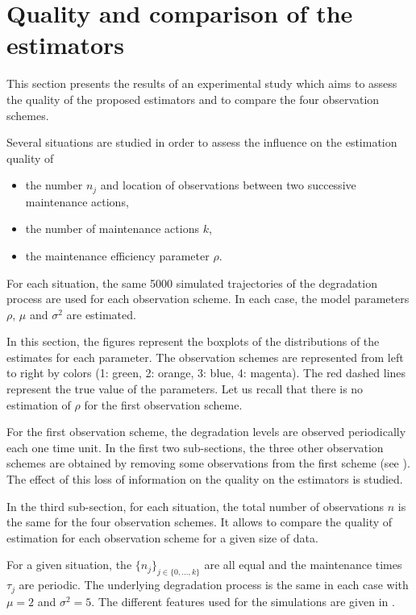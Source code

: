 \section{Quality and comparison of the estimators}
\label{section:simu}
This section presents the results of an experimental study
which aims to assess the quality of the proposed estimators and to compare the four observation schemes.

Several situations are studied in order to assess the influence on the estimation quality of
\begin{itemize}
\item the number $n_j$ and location of observations between two successive maintenance actions,
\item the number of maintenance actions $k$,
\item the maintenance efficiency parameter $\rho$.
\end{itemize}

For each situation, the same 5000 simulated trajectories of the degradation process are used for each observation scheme. In each case, the model parameters $\rho$, $\mu$ and $\sigma^2$ are estimated.

In this section, the figures represent the boxplots of the distributions of the estimates for each parameter.
The observation schemes are represented from left to right by colors (1: green, 2: orange, 3: blue, 4: magenta). The red dashed lines represent the true value of the parameters. Let us recall that there is no estimation of $\rho$ for the first observation scheme. 


For the first observation scheme, the degradation levels are observed periodically each one time unit.
In the first two sub-sections, the three other observation schemes are obtained by removing some observations from the first scheme (see ).
The effect of this loss of information on the quality on the estimators is studied. 

In the third sub-section, for each situation, the total number of observations $n$ is the same for the four observation schemes.  It allows to compare the quality of estimation for each observation scheme for a given size of data.


For a given situation, the $\{n_j\}_{j\in \{0,...,k\}}$ are all equal and the maintenance times $\tau_j$ are periodic.
The underlying degradation process is the same in each case with $\mu=2$ and $\sigma^2=5$.
The different features used for the simulations are given  in \mbox{}. 



